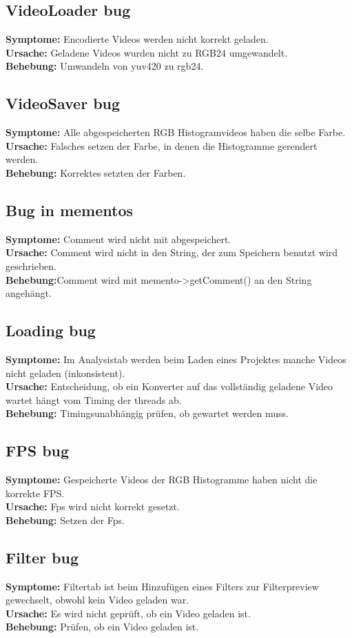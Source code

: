 \documentclass{scrartcl}
\begin{document}
{\subsection{VideoLoader bug}
\textbf{Symptome:}
Encodierte Videos werden nicht korrekt geladen.\\
\textbf{Ursache:}
Geladene Videos wurden nicht zu RGB24 umgewandelt.\\
\textbf{Behebung:}
Umwandeln von yuv420 zu rgb24.
\subsection{VideoSaver bug}
\textbf{Symptome:}
Alle abgespeicherten RGB Histogramvideos haben die selbe Farbe.\\
\textbf{Ursache:}
Falsches setzen der Farbe, in denen die Histogramme gerendert werden.\\
\textbf{Behebung:}
Korrektes setzten der Farben.
\subsection{Bug in mementos}
\textbf{Symptome:} Comment wird nicht mit abgespeichert.\\
\textbf{Ursache:} Comment wird nicht in den String, der zum Speichern benutzt wird geschrieben.\\
\textbf{Behebung:}Comment wird mit memento->getComment() an den String angehängt.
\subsection{Loading bug}
\textbf{Symptome:}
Im Analysistab werden beim Laden eines Projektes manche Videos nicht geladen (inkonsistent).\\
\textbf{Ursache:}
Entscheidung, ob ein Konverter auf das vollständig geladene Video wartet hängt vom Timing der threads ab.\\
\textbf{Behebung:}
Timingsunabhängig prüfen, ob gewartet werden muss.
\subsection{FPS bug}
\textbf{Symptome:}
Gespeicherte Videos der RGB Histogramme haben nicht die korrekte FPS.\\
\textbf{Ursache:}
Fps wird nicht korrekt gesetzt.\\
\textbf{Behebung:}
Setzen der Fps.
\subsection{Filter bug}
\textbf{Symptome:}
Filtertab ist beim Hinzufügen eines Filters zur Filterpreview gewechselt, obwohl kein Video geladen war.\\
\textbf{Ursache:}
Es wird nicht geprüft, ob ein Video geladen ist.\\
\textbf{Behebung:}
Prüfen, ob ein Video geladen ist.
}
\end{document}
